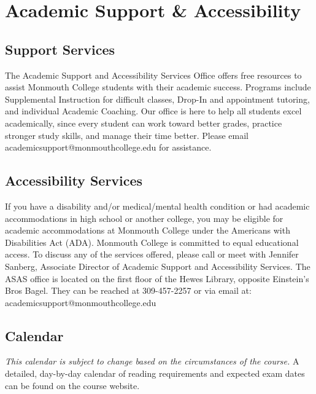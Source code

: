 \documentclass[10pt]{article}
\begin{document}
\section{Academic Support \& Accessibility}

\subsection*{Support Services}
The Academic Support and Accessibility Services Office offers free resources to assist Monmouth College students with their academic success. Programs include Supplemental Instruction for difficult classes, Drop-In and appointment tutoring, and individual Academic Coaching. Our office is here to help all students excel academically, since every student can work toward better grades, practice stronger study skills, and manage their time better. Please email academicsupport@monmouthcollege.edu for assistance.

\subsection*{Accessibility Services}
If you have a disability and/or medical/mental health condition or had academic accommodations in high school or another college, you may be eligible for academic accommodations at Monmouth College under the Americans with Disabilities Act (ADA). Monmouth College is committed to equal educational access. To discuss any of the services offered, please call or meet with Jennifer Sanberg, Associate Director of Academic Support and Accessibility Services. The ASAS office is located on the first floor of the Hewes Library, opposite Einstein’s Bros Bagel. They can be reached at 309-457-2257 or via email at: academicsupport@monmouthcollege.edu

\subsection{Calendar}

\textit{This calendar is subject to change based on the circumstances of the course.} A detailed, day-by-day calendar of reading requirements and expected exam dates can be found on the course website.
\end{document}
